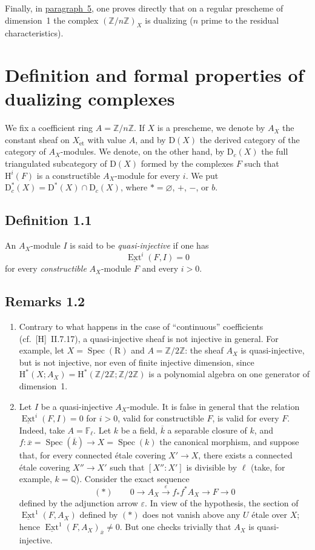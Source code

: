 \documentclass[11pt]{article}
\renewcommand{\H}{\mathrm{H}}
\DeclareMathOperator{\Ext}{Ext}
\DeclareMathOperator{\Spec}{Spec}
\newcommand{\R}{\mathrm{R}}
\newcommand{\D}{\mathrm{D}}
\newcommand{\Z}{\mathbb{Z}}
\newcommand{\F}{\mathbb{F}}
\newcommand{\Q}{\mathbb{Q}}
\newcommand{\ol}[1]{\overline{#1}}
\providecommand{\R}{\mathrm R}
\providecommand{\Z}{\mathbb Z}
\providecommand{\Spec}{\operatorname{Spec}}
\providecommand{\Spec}{\operatorname{Spec}}
\providecommand{\Spec}{\operatorname{Spec}}
\providecommand{\Spec}{\operatorname{Spec}}
\begin{document}
Finally, in \hyperref[sga5:I:section:5]{paragraph~5}, one proves directly that on a regular prescheme of dimension~1 the complex $(\Z/n\Z)_X$ is dualizing ($n$ prime to the residual characteristics).

\section{Definition and formal properties of dualizing complexes}

We fix a coefficient ring $A = \Z/n\Z$. If $X$ is a prescheme, we denote by $A_X$ the constant sheaf on $X_{\mathrm{\acute{e}t}}$ with value $A$, and by $\D(X)$ the derived category of the category of $A_X$-modules. We denote, on the other hand, by $\D_c(X)$ the full triangulated subcategory of $\D(X)$ formed by the complexes $F$ such that $\H^i(F)$ is a constructible $A_X$-module for every $i$. We put $\D_c^{*}(X) = \D^{*}(X) \cap \D_c(X)$, where $* = \varnothing$, $+$, $-$, or $b$.

\subsection*{Definition 1.1}\label{sga5:I:definition:1.1}
An $A_X$-module $I$ is said to be \emph{quasi-injective} if one has
\[
\underline{\Ext}^i(F,I) = 0
\]
for every \emph{constructible} $A_X$-module $F$ and every $i > 0$.

\subsection*{Remarks 1.2}\label{sga5:I:remark:1.2}
\begin{enumerate}[label=\alph*)]
\item Contrary to what happens in the case of ``continuous'' coefficients (cf.~[H]~II.7.17), a quasi-injective sheaf is not injective in general. For example, let $X = \Spec(\R)$ and $A = \Z/2\Z$: the sheaf $A_X$ is quasi-injective, but is not injective, nor even of finite injective dimension, since $\H^{*}(X; A_X) = \H^{*}(\Z/2\Z; \Z/2\Z)$ is a polynomial algebra on one generator of dimension~1.

\item Let $I$ be a quasi-injective $A_X$-module. It is false in general that the relation $\underline{\Ext}^i(F,I) = 0$ for $i > 0$, valid for constructible $F$, is valid for every $F$. Indeed, take $A = \F_{\ell}$. Let $k$ be a field, $\ol{k}$ a separable closure of $k$, and $f : \ol{x} = \Spec(\ol{k}) \to X = \Spec(k)$ the canonical morphism, and suppose that, for every connected étale covering $X' \to X$, there exists a connected étale covering $X'' \to X'$ such that $[X'':X']$ is divisible by $\ell$ (take, for example, $k = \Q$). Consider the exact sequence
\[
(*) \qquad 0 \longrightarrow A_X \xrightarrow{\;\varepsilon\;} f_{*}f^{*}A_X \longrightarrow F \longrightarrow 0
\]
defined by the adjunction arrow $\varepsilon$. In view of the hypothesis, the section of $\underline{\Ext}^1(F,A_X)$ defined by $(*)$ does not vanish above any $U$ étale over $X$; hence $\underline{\Ext}^1(F,A_X)_{\ol{x}} \neq 0$. But one checks trivially that $A_X$ is quasi-injective.
\end{enumerate}
\end{document}
